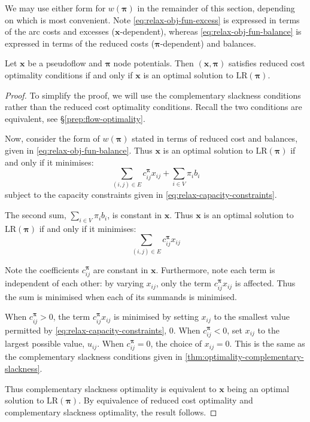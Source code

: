 We may use either form for $w(\boldsymbol{\pi})$ in the remainder of this section, depending on which is most convenient. Note \cref{eq:relax-obj-fun-excess} is expressed in terms of the arc costs and excesses ($\mathbf{x}$-dependent), whereas \cref{eq:relax-obj-fun-balance} is expressed in terms of the reduced costs ($\boldsymbol{\pi}$-dependent) and balances.

\begin{lemma} \label{lemma:relax-rc-lr-equivalence}
Let $\mathbf{x}$ be a pseudoflow and $\boldsymbol{\pi}$ node potentials. Then $\left(\mathbf{x},\boldsymbol{\pi}\right)$ satisfies reduced cost optimality conditions if and only if $\mathbf{x}$ is an optimal solution to $\mathrm{LR}(\boldsymbol{\pi})$.
\end{lemma}
\begin{proof}
To simplify the proof, we will use the complementary slackness conditions rather than the reduced cost optimality conditions. Recall the two conditions are equivalent, see \S\ref{prep:flow-optimality}.

Now, consider the form of $w(\boldsymbol{\pi})$ stated in terms of reduced cost and balances, given in \cref{eq:relax-obj-fun-balance}. Thus $\mathbf{x}$ is an optimal solution to $\mathrm{LR}(\boldsymbol{\pi})$ if and only if it minimises:
\[\sum_{\left(i,j\right)\in E}c_{ij}^{\boldsymbol{\pi}}x_{ij}+\sum_{i\in V}\pi_{i}b_{i}\]
subject to the capacity constraints given in \cref{eq:relax-capacity-constraints}.

The second sum, $\sum_{i \in V} \pi_i b_i$, is constant in $\mathbf{x}$. Thus $\mathbf{x}$ is an optimal solution to $\mathrm{LR}(\boldsymbol{\pi})$ if and only if it minimises:
\[\sum_{\left(i,j\right)\in E}c_{ij}^{\boldsymbol{\pi}}x_{ij}\]

Note the coefficients $c_{ij}^{\boldsymbol{\pi}}$ are constant in $\mathbf{x}$. Furthermore, note each term is independent of each other: by varying $x_{ij}$, only the term $c_{ij}^{\boldsymbol{\pi}}x_{ij}$ is affected\footnotemark. Thus the sum is minimised when each of its summands is minimised.

When $c_{ij}^{\boldsymbol{\pi}}>0$, the term $c_{ij}^{\boldsymbol{\pi}}x_{ij}$ is minimised by setting $x_{ij}$ to the smallest value permitted by \cref{eq:relax-capacity-constraints}, $0$. When $c_{ij}^{\boldsymbol{\pi}}<0$, set $x_{ij}$ to the largest possible value, $u_{ij}$. When $c_{ij}^{\boldsymbol{\pi}}=0$, the choice of $x_{ij}=0$. This is the same as the complementary slackness conditions given in \cref{thm:optimality-complementary-slackness}. 

Thus complementary slackness optimality is equivalent to $\mathbf{x}$ being an optimal solution to $\mathrm{LR}(\boldsymbol{\pi})$. By equivalence of reduced cost optimality and complementary slackness optimality, the result follows.
\end{proof}

